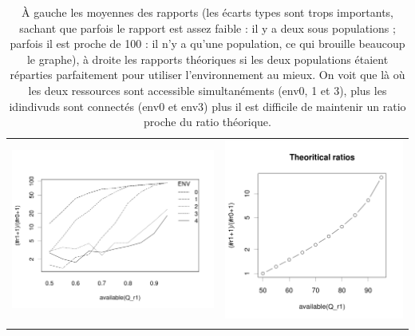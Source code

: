 \documentclass[a4paper,10pt]{article}
\begin{document}
\begin{table}[ht]
 \centering
 \caption{À gauche les moyennes des rapports (les écarts types sont trops importants, sachant que parfois le rapport est assez faible : il y a deux sous populations ; parfois il est proche de 100 : il n'y a qu'une population, ce qui brouille beaucoup le graphe), à droite les rapports théoriques si les deux populations étaient réparties parfaitement pour utiliser l'environnement au mieux. On voit que là où les deux ressources sont accessible simultanéments (env0, 1 et 3), plus les idindivuds sont connectés (env0 et env3) plus il est difficile de maintenir un ratio proche du ratio théorique.}
 \begin{tabular}{cc}
 \includegraphics[width=\imgSize]{images/5StaticEnv/ratioR1R2foreachEnv}&\includegraphics[width=\imgSize]{images/5StaticEnv/theroticalRatios.png}\\
 \newline
 \end{tabular}
\end{table}
\end{document}

